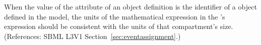 When the value of the  attribute of an \EventAssignment
object definition is the identifier of a \Compartment object defined in the
model, the units of the mathematical expression in the \EventAssignment's
 expression should be consistent with the units of that
compartment's size.  (References: SBML L3V1
Section~\ref{sec:eventassignment}.)
